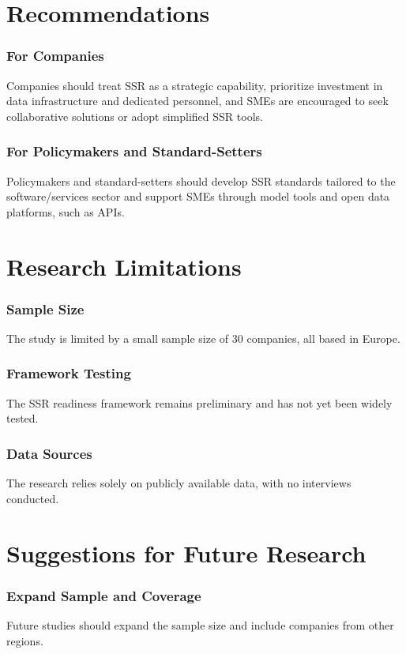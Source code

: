 \section{Recommendations}
\subsubsection{For Companies}
Companies should treat SSR as a strategic capability, prioritize investment in data infrastructure and dedicated personnel, and SMEs are encouraged to seek collaborative solutions or adopt simplified SSR tools.

\subsubsection{For Policymakers and Standard-Setters}
Policymakers and standard-setters should develop SSR standards tailored to the software/services sector and support SMEs through model tools and open data platforms, such as APIs.

\section{Research Limitations}
\subsubsection{Sample Size}
The study is limited by a small sample size of 30 companies, all based in Europe.

\subsubsection{Framework Testing}
The SSR readiness framework remains preliminary and has not yet been widely tested.

\subsubsection{Data Sources}
The research relies solely on publicly available data, with no interviews conducted.

\section{Suggestions for Future Research}
\subsubsection{Expand Sample and Coverage}
Future studies should expand the sample size and include companies from other regions.

